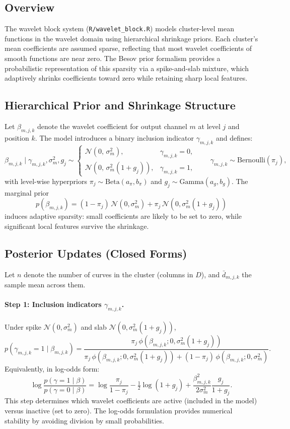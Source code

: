 \documentclass[11pt]{article}
\begin{document}
\subsection{Overview}

The wavelet block system (\texttt{R/wavelet\_block.R}) models cluster-level mean functions in the wavelet domain using hierarchical shrinkage priors. Each cluster’s mean coefficients are assumed sparse, reflecting that most wavelet coefficients of smooth functions are near zero. The Besov prior formalism provides a probabilistic representation of this sparsity via a spike-and-slab mixture, which adaptively shrinks coefficients toward zero while retaining sharp local features.

\subsection{Hierarchical Prior and Shrinkage Structure}

Let $\beta_{m,j,k}$ denote the wavelet coefficient for output channel $m$ at level $j$ and position $k$. The model introduces a binary inclusion indicator $\gamma_{m,j,k}$ and defines:
\[
\beta_{m,j,k} \mid \gamma_{m,j,k}, \sigma_m^2, g_j \sim
\begin{cases}
\mathcal{N}(0,\,\sigma_m^2), & \gamma_{m,j,k}=0,\\[4pt]
\mathcal{N}(0,\,\sigma_m^2(1+g_j)), & \gamma_{m,j,k}=1,
\end{cases}
\qquad
\gamma_{m,j,k} \sim \text{Bernoulli}(\pi_j),
\]
with level-wise hyperpriors $\pi_j \sim \text{Beta}(a_\pi,b_\pi)$ and $g_j \sim \text{Gamma}(a_g,b_g)$. The marginal prior
\[
p(\beta_{m,j,k}) = (1-\pi_j)\,\mathcal{N}(0,\sigma_m^2)
+ \pi_j\,\mathcal{N}(0,\sigma_m^2(1+g_j))
\]
induces adaptive sparsity: small coefficients are likely to be set to zero, while significant local features survive the shrinkage.

\subsection{Posterior Updates (Closed Forms)}

Let $n$ denote the number of curves in the cluster (columns in $D$), and $\bar{d}_{m,j,k}$ the sample mean across them.

\paragraph{Step 1: Inclusion indicators $\gamma_{m,j,k}$.}
Under spike $\mathcal{N}(0,\sigma_m^2)$ and slab $\mathcal{N}(0,\sigma_m^2(1+g_j))$,
\[
p(\gamma_{m,j,k}=1 \mid \beta_{m,j,k})
= \frac{\pi_j\,\phi(\beta_{m,j,k};0,\sigma_m^2(1+g_j))}
       {\pi_j\,\phi(\beta_{m,j,k};0,\sigma_m^2(1+g_j)) + (1-\pi_j)\,\phi(\beta_{m,j,k};0,\sigma_m^2)}.
\]
Equivalently, in log-odds form:
\[
\log\frac{p(\gamma=1\mid \beta)}{p(\gamma=0\mid \beta)}
= \log\frac{\pi_j}{1-\pi_j} - \tfrac{1}{2}\log(1+g_j)
  + \frac{\beta_{m,j,k}^2}{2\sigma_m^2}\frac{g_j}{1+g_j}.
\]
This step determines which wavelet coefficients are active (included in the model) versus inactive (set to zero). The log-odds formulation provides numerical stability by avoiding division by small probabilities.
\end{document}
